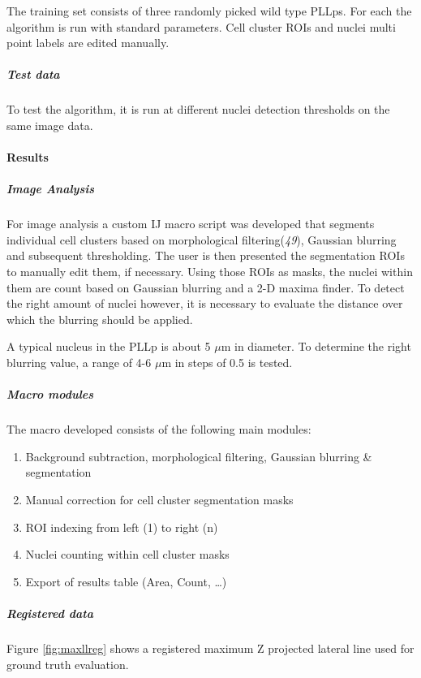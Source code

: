 \documentclass[11pt,singlespacinge,twoside]{reedthesis} %
\providecommand{\tightlist}{%
  \setlength{\itemsep}{0pt}\setlength{\parskip}{0pt}}
\begin{document}
The training set consists of three randomly picked wild type PLLps. For each the algorithm is run with standard parameters. Cell cluster ROIs and nuclei multi point labels are edited manually.

\hypertarget{test-data}{%
\subparagraph{Test data}\label{test-data}}

To test the algorithm, it is run at different nuclei detection thresholds on the same image data.

\hypertarget{results}{%
\paragraph{Results}\label{results}}

\hypertarget{image-analysis}{%
\subparagraph{Image Analysis}\label{image-analysis}}

For image analysis a custom IJ macro script was developed that segments individual cell clusters based on morphological filtering(\emph{49}), Gaussian blurring and subsequent thresholding. The user is then presented the segmentation ROIs to manually edit them, if necessary. Using those ROIs as masks, the nuclei within them are count based on Gaussian blurring and a 2-D maxima finder. To detect the right amount of nuclei however, it is necessary to evaluate the distance over which the blurring should be applied.

A typical nucleus in the PLLp is about 5 \(\mu\)m in diameter. To determine the right blurring value, a range of 4-6 \(\mu\)m in steps of 0.5 is tested.

\hypertarget{macro-modules}{%
\subparagraph{Macro modules}\label{macro-modules}}

The macro developed consists of the following main modules:
\begin{enumerate}
\def\labelenumi{\arabic{enumi}.}
\tightlist
\item
  Background subtraction, morphological filtering, Gaussian blurring \& segmentation
\item
  Manual correction for cell cluster segmentation masks
\item
  ROI indexing from left (1) to right (n)
\item
  Nuclei counting within cell cluster masks
\item
  Export of results table (Area, Count, \ldots{})
\end{enumerate}
\hypertarget{registered-data}{%
\subparagraph{Registered data}\label{registered-data}}

Figure \ref{fig:maxllreg} shows a registered maximum Z projected lateral line used for ground truth evaluation.
\end{document}
